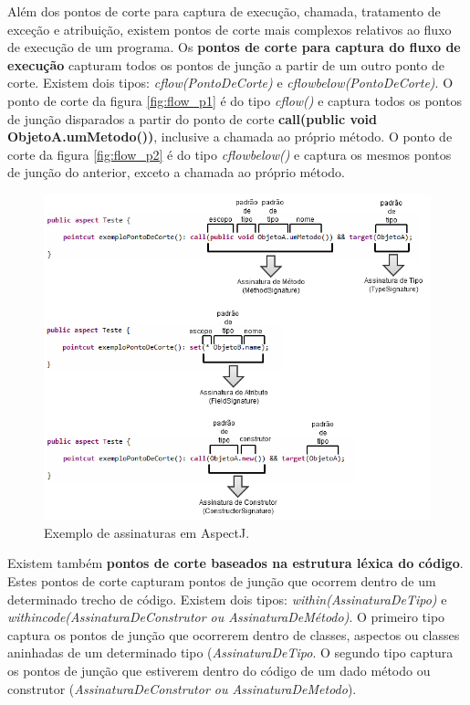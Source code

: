 Além dos pontos de corte para captura de execução, chamada, tratamento de exceção e atribuição, existem pontos de corte mais complexos relativos ao
fluxo de execução de um programa. Os \textbf{pontos de corte para captura do fluxo de execução} capturam todos os pontos de junção a partir de um outro ponto de
corte. Existem dois tipos: \textit{cflow(PontoDeCorte)} e \textit{cflowbelow(PontoDeCorte)}. O ponto de corte da figura \ref{fig:flow_p1}
é do tipo \textit{cflow()} e captura todos os pontos de junção disparados a partir do ponto de corte \textbf{call(public void ObjetoA.umMetodo())},
inclusive a chamada ao próprio método. O ponto de corte da figura \ref{fig:flow_p2} é do tipo \textit{cflowbelow()} e captura os mesmos pontos de
junção do anterior, exceto a chamada ao próprio método.

\begin{figure}[!htb]
	\centering
	\includegraphics{img/signatures.png}
	\caption{Exemplo de assinaturas em AspectJ.}\label{fig:signatures}
\end{figure}

Existem também \textbf{pontos de corte baseados na estrutura léxica do código}. Estes pontos de corte capturam pontos de junção que ocorrem dentro de
um determinado trecho de código. Existem dois tipos: \textit{within(AssinaturaDeTipo)} e \textit{withincode(AssinaturaDeConstrutor ou
AssinaturaDeMétodo)}. O primeiro tipo captura os pontos de junção que ocorrerem dentro de classes, aspectos ou classes aninhadas de um determinado
tipo (\textit{AssinaturaDeTipo}. O segundo tipo captura os pontos de junção que estiverem dentro do código de um dado método ou construtor
(\textit{AssinaturaDeConstrutor ou AssinaturaDeMetodo}). 

